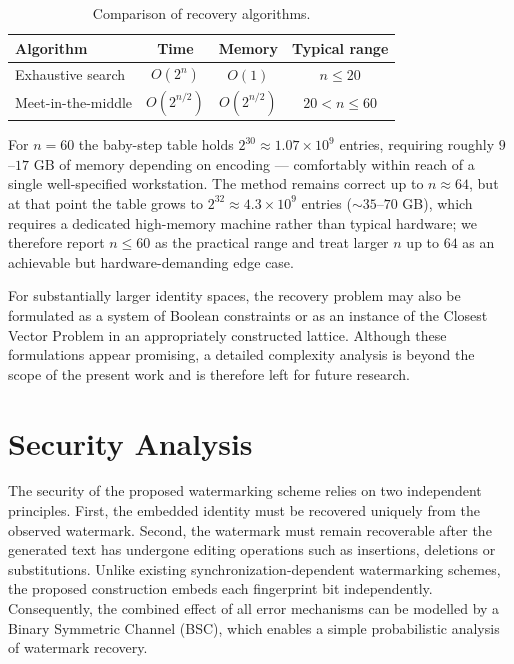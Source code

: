 \documentclass[a4paper,11pt]{llncs}
\begin{document}
\begin{table}[ht]
\centering
\caption{Comparison of recovery algorithms.}
\label{tab:recovery-comparison}
\begin{tabular}{lccc}
\hline
Algorithm & Time & Memory & Typical range \\
\hline
Exhaustive search      & $O(2^n)$     & $O(1)$        & $n\le20$ \\
Meet-in-the-middle     & $O(2^{n/2})$ & $O(2^{n/2})$  & $20<n\le60$ \\
\hline
\end{tabular}
\end{table}

For $n=60$ the baby-step table holds $2^{30}\approx1.07\times10^9$ entries, requiring
roughly $9$--$17$ GB of memory depending on encoding --- comfortably within reach of a
single well-specified workstation. The method remains correct up to $n\approx64$, but
at that point the table grows to $2^{32}\approx4.3\times10^9$ entries
($\sim35$--$70$ GB), which requires a dedicated high-memory machine rather than typical
hardware; we therefore report $n\le60$ as the practical range and treat larger $n$ up to
$64$ as an achievable but hardware-demanding edge case.

%
For substantially larger identity spaces, the recovery problem may also
be formulated as a system of Boolean constraints or as an instance of
the Closest Vector Problem in an appropriately constructed lattice.
Although these formulations appear promising, a detailed complexity
analysis is beyond the scope of the present work and is therefore left
for future research.

\section{Security Analysis}
\label{sec:security}

The security of the proposed watermarking scheme relies on two
independent principles. First, the embedded identity must be recovered
uniquely from the observed watermark. Second, the watermark must remain
recoverable after the generated text has undergone editing operations
such as insertions, deletions or substitutions.
Unlike existing synchronization-dependent watermarking schemes, the
proposed construction embeds each fingerprint bit independently.
Consequently, the combined effect of all error mechanisms can be
modelled by a Binary Symmetric Channel (BSC), which enables a simple
probabilistic analysis of watermark recovery.
\end{document}

